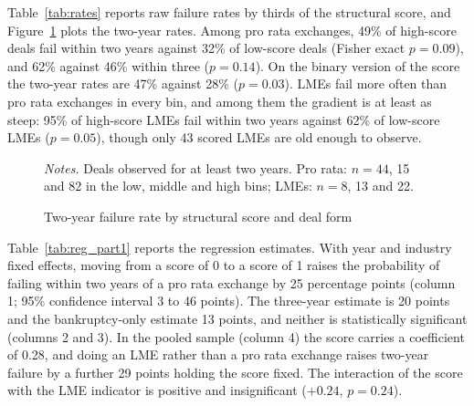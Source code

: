 \documentclass[12pt]{article}
\begin{document}
Table~\ref{tab:rates} reports raw failure rates by thirds of the structural score, and Figure~\ref{fig:bins} plots the two-year rates. Among pro rata exchanges, 49\% of high-score deals fail within two years against 32\% of low-score deals (Fisher exact $p = 0.09$), and 62\% against 46\% within three ($p = 0.14$). On the binary version of the score the two-year rates are 47\% against 28\% ($p = 0.03$). LMEs fail more often than pro rata exchanges in every bin, and among them the gradient is at least as steep: 95\% of high-score LMEs fail within two years against 62\% of low-score LMEs ($p = 0.05$), though only 43 scored LMEs are old enough to observe.



\begin{figure}[htbp]
\centering
{}
\caption{Two-year failure rate by structural score and deal form}
\label{fig:bins}
\begin{minipage}{0.9\textwidth}\vspace{4pt}\footnotesize
\textit{Notes.} Deals observed for at least two years. Pro rata: $n = 44$, 15 and 82 in the low, middle and high bins; LMEs: $n = 8$, 13 and 22.
\end{minipage}
\end{figure}

Table~\ref{tab:reg_part1} reports the regression estimates. With year and industry fixed effects, moving from a score of 0 to a score of 1 raises the probability of failing within two years of a pro rata exchange by 25 percentage points (column 1; 95\% confidence interval 3 to 46 points). The three-year estimate is 20 points and the bankruptcy-only estimate 13 points, and neither is statistically significant (columns 2 and 3). In the pooled sample (column 4) the score carries a coefficient of 0.28, and doing an LME rather than a pro rata exchange raises two-year failure by a further 29 points holding the score fixed. The interaction of the score with the LME indicator is positive and insignificant ($+0.24$, $p = 0.24$).
\end{document}
